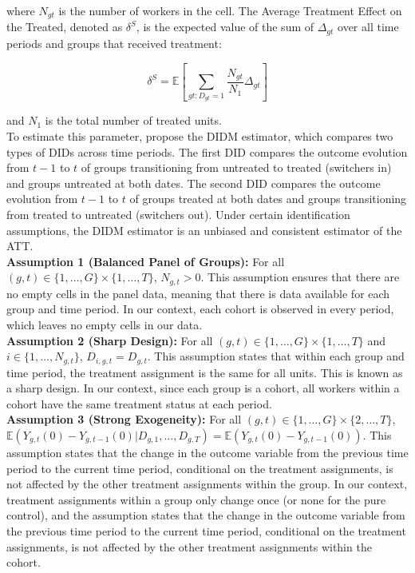 \documentclass[oneside,11pt]{article}
\begin{document}
\noindent where $N_{gt}$ is the number of workers in the cell. The Average Treatment Effect on the Treated, denoted as $\delta^{S}$, is the expected value of the sum of $\Delta_{gt}$ over all time periods and groups that received treatment:

\begin{equation}
    \tag{$ATT$}
    \delta^{S} = \mathbb{E}\left[\sum_{gt:D_{gt}=1} \frac{N_{gt}}{N_1} \Delta_{gt}\right]
\end{equation}

\noindent and $N_1$ is the total number of treated units. \\

To estimate this parameter, \cite{de2020two} propose the DIDM estimator, which compares two types of DIDs across time periods. The first DID compares the outcome evolution from $t-1$ to $t$ of groups transitioning from untreated to treated (switchers in) and groups untreated at both dates. The second DID compares the outcome evolution from $t-1$ to $t$ of groups treated at both dates and groups transitioning from treated to untreated (switchers out). Under certain identification assumptions, the DIDM estimator is an unbiased and consistent estimator of the ATT. \\


\textbf{Assumption 1 (Balanced Panel of Groups):} For all $(g,t) \in \{1, \ldots, G\} \times \{1, \ldots, T\}$, $N_{g,t} > 0$. This assumption ensures that there are no empty cells in the panel data, meaning that there is data available for each group and time period. In our context, each cohort is observed in every period, which leaves no empty cells in our data. \\

\textbf{Assumption 2 (Sharp Design):} For all $(g,t) \in \{1, \ldots, G\} \times \{1, \ldots, T\}$ and $i \in \{1, \ldots, N_{g,t}\}$, $D_{i,g,t} = D_{g,t}$. This assumption states that within each group and time period, the treatment assignment is the same for all units. This is known as a sharp design. In our context, since each group is a cohort, all workers within a cohort have the same treatment status at each period. \\

\textbf{Assumption 3 (Strong Exogeneity):} For all $(g,t) \in \{1, \ldots, G\} \times \{2, \ldots, T\}$, $\mathbb{E}(Y_{g,t}(0) - Y_{g,t-1}(0) | D_{g,1}, \ldots, D_{g,T}) = \mathbb{E}(Y_{g,t}(0) - Y_{g,t-1}(0))$. This assumption states that the change in the outcome variable from the previous time period to the current time period, conditional on the treatment assignments, is not affected by the other treatment assignments within the group. In our context, treatment assignments within a group only change once (or none for the pure control), and the assumption states that the change in the outcome variable from the previous time period to the current time period, conditional on the treatment assignments, is not affected by the other treatment assignments within the cohort. \\
\end{document}
